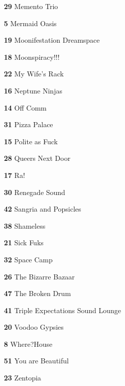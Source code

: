 \begin{multicols}{2}
\begin{itemize}[itemsep=.0125mm,parsep=2pt]
   \item[\textbf{ 29 }] Memento Trio
   \item[\textbf{ 5 }] Mermaid Oasis
   \item[\textbf{ 19 }] Moonifestation Dreamspace
   \item[\textbf{ 18 }] Moonspiracy!!!
   \item[\textbf{ 22 }] My Wife's Rack
   \item[\textbf{ 16 }] Neptune Ninjas
   \item[\textbf{ 14 }] Off Comm
   \item[\textbf{ 31 }] Pizza Palace
   \item[\textbf{ 15 }] Polite as Fuck
   \item[\textbf{ 28 }] Queers Next Door
   \item[\textbf{ 17 }] Ra!
   \item[\textbf{ 30 }] Renegade Sound
   \item[\textbf{ 42 }] Sangria and Popsicles
   \item[\textbf{ 38 }] Shameless
   \item[\textbf{ 21 }] Sick Fuks
   \item[\textbf{ 32 }] Space Camp
   \item[\textbf{ 26 }] The Bizarre Bazaar
   \item[\textbf{ 47 }] The Broken Drum
   \item[\textbf{ 41 }] Triple Expectations Sound Lounge
   \item[\textbf{ 20 }] Voodoo Gypsies
   \item[\textbf{ 8 }] Where?House
   \item[\textbf{ 51 }] You are Beautiful
   \item[\textbf{ 23 }] Zentopia
\end{itemize}
\end{multicols}

\clearpage
